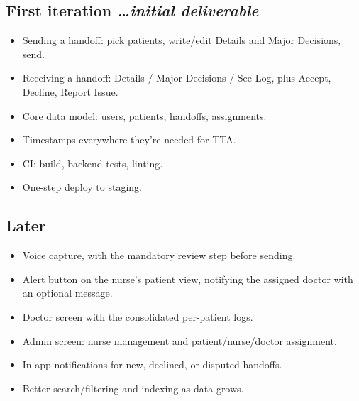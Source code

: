 \documentclass[11pt,a4paper]{article}
\newcommand{\BvrHint}[1]{%
  {\normalfont\normalsize\itshape\hfill #1}}
\begin{document}
\subsection{First iteration %
\BvrHint{\ldots initial deliverable}}
\begin{itemize}[leftmargin=0.7cm]
    \item Sending a handoff: pick patients, write/edit Details and Major Decisions, send.
    \item Receiving a handoff: Details / Major Decisions / See Log, plus Accept, Decline, Report Issue.
    \item Core data model: users, patients, handoffs, assignments.
    \item Timestamps everywhere they're needed for TTA.
    \item CI: build, backend tests, linting.
    \item One-step deploy to staging.
\end{itemize}

\subsection{Later}
\begin{itemize}[leftmargin=0.7cm]
    \item Voice capture, with the mandatory review step before sending.
    \item Alert button on the nurse's patient view, notifying the assigned doctor with an optional message.
    \item Doctor screen with the consolidated per-patient logs.
    \item Admin screen: nurse management and patient/nurse/doctor assignment.
    \item In-app notifications for new, declined, or disputed handoffs.
    \item Better search/filtering and indexing as data grows.
\end{itemize}
\end{document}
